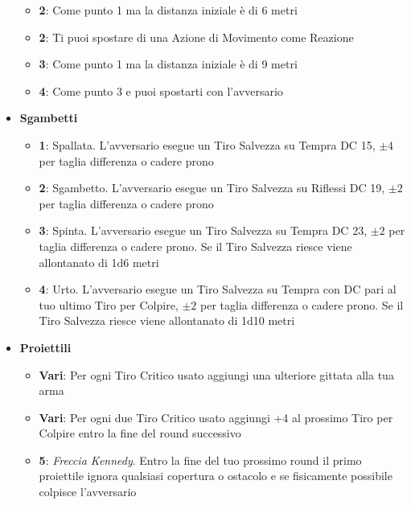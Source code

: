 \begin{multicols}{2}
\begin{itemize}[leftmargin=*]
\begin{itemize}[leftmargin=*]
		\item \textbf{2}: Come punto 1 ma la distanza iniziale è di 6 metri

		\item \textbf{2}: Ti puoi spostare di una Azione di Movimento come Reazione

		\item \textbf{3}: Come punto 1 ma la distanza iniziale è di 9 metri

		\item \textbf{4}: Come punto 3 e puoi spostarti con l'avversario
	\end{itemize}

	\item \textbf{Sgambetti}
	\begin{itemize}[leftmargin=*]
		\setlength{\itemsep}{0pt}
		\item \textbf{1}: Spallata. L'avversario esegue un Tiro Salvezza su Tempra DC 15, $ \pm 4 $ per taglia differenza o cadere prono

		\item \textbf{2}: Sgambetto. L'avversario esegue un Tiro Salvezza su Riflessi DC 19, $ \pm 2 $ per taglia differenza o cadere prono

		\item \textbf{3}: Spinta. L'avversario esegue un Tiro Salvezza su Tempra DC 23, $ \pm 2 $ per taglia differenza o cadere prono. Se il Tiro Salvezza riesce viene allontanato di 1d6 metri

		\item \textbf{4}: Urto. L'avversario esegue un Tiro Salvezza su Tempra con DC pari al tuo ultimo Tiro per Colpire, $ \pm 2 $ per taglia differenza o cadere prono. Se il Tiro Salvezza riesce viene allontanato di 1d10 metri
	\end{itemize}

	\item \textbf{Proiettili}
	\begin{itemize}[leftmargin=*]
		\setlength{\itemsep}{0pt}
		\item \textbf{Vari}: Per ogni Tiro Critico usato aggiungi una ulteriore gittata alla tua arma

		\item \textbf{Vari}: Per ogni due Tiro Critico usato aggiungi +4 al prossimo Tiro per Colpire entro la fine del round successivo

		\item \textbf{5}: \emph{Freccia Kennedy}. Entro la fine del tuo prossimo round il primo proiettile ignora qualsiasi copertura o ostacolo e se fisicamente possibile colpisce l'avversario
	\end{itemize}


\end{itemize}
\end{multicols}

